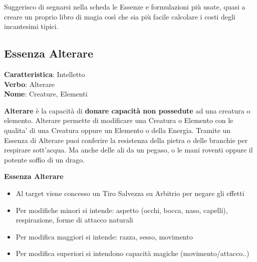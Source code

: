 \documentclass[a4paper,11pt,twoside,openany]{book}
\begin{document}
Suggerisco di segnarsi nella scheda le Essenze e formulazioni più usate, quasi a creare un proprio libro di magia così che sia più facile calcolare i costi degli incantesimi tipici.

\pagebreak

\subsection{Essenza Alterare}

\textbf{Caratteristica}: Intelletto\\
\textbf{Verbo}: Alterare\\
\textbf{Nome}: Creature, Elementi\\

\label{essenza-alterare---intelletto}

\textbf{Alterare} è la capacità di \textbf{donare capacità non possedute} ad una creatura o elemento.
Alterare permette di modificare una Creatura o Elemento con le qualita' di una Creatura oppure un Elemento o della Energia.
Tramite un Essenza di Alterare puoi conferire la resistenza della pietra o delle branchie per   respirare sott'acqua.
Ma anche delle ali da un pegaso, o le mani roventi oppure il potente soffio di un drago.

\bigskip

\textbf{Essenza Alterare}
\begin{itemize}
	\item
	      Al target viene concesso un Tiro Salvezza su Arbitrio per negare gli effetti
	\item
	      Per modifiche minori si intende: aspetto (occhi, bocca, naso, capelli), respirazione, forme di attacco naturali
	\item
	      Per modifica maggiori si intende: razza, sesso, movimento
	\item
	      Per modifica superiori si intendono capacità magiche (movimento/attacco..)
\end{itemize}

\bigskip
\end{document}
